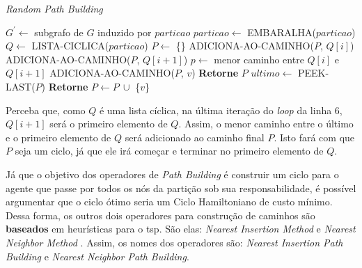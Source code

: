 \begin{algorithm}                   %
	\caption{\textit{Random Path Building}}          %
	\label{path_random}                           %
	\begin{algorithmic}[1]                   %
		\newline
		\State $G^{\prime} \gets $ subgrafo de $G$ induzido por $particao$
		\State $particao \gets $ EMBARALHA($particao$) 
		\State $Q \gets $ LISTA-CICLICA($particao$)
		\State $P \gets $ \{\} 
				\State ADICIONA-AO-CAMINHO($P$, $Q[i]$)
				\State ADICIONA-AO-CAMINHO($P$, $Q[i+1]$)
			\Else
				\State $p \gets $ menor caminho entre $Q[i]$ e $Q[i+1]$
					\State ADICIONA-AO-CAMINHO($P$, $v$)
				\EndFor
			\EndIf
		\EndFor
		\State \textbf{Retorne} $P$
		\EndProcedure
		\State $ultimo \gets $ PEEK-LAST($P$) 
			\State \textbf{Retorne}
		\Else
			\State $P \gets P\ \cup $ \{$v$\}
		\EndIf
		\EndProcedure
	\end{algorithmic}
\end{algorithm}

Perceba que, como $Q$ é uma lista cíclica, na última iteração do \textit{loop} 
da linha 6, $Q[i+1]$ será o primeiro elemento de $Q$. Assim, o menor caminho 
entre o último e o primeiro elemento de $Q$ será adicionado ao caminho final 
$P$. Isto fará com que $P$ seja um ciclo, já que ele irá começar e terminar no 
primeiro elemento de $Q$.

Já que o objetivo dos operadores de \textit{Path Building} é construir um ciclo 
para o agente que passe por todos os nós da partição sob sua responsabilidade, 
é possível argumentar que o ciclo ótimo seria um Ciclo Hamiltoniano de custo 
mínimo. Dessa forma, os outros dois operadores para construção de caminhos são 
\textbf{baseados} em heurísticas para o \ac{tsp}. São elas: 
\textit{Nearest Insertion Method} e \textit{Nearest Neighbor Method} 
\citep{nilsson2003heuristics}. Assim, os nomes dos operadores são: 
\textit{Nearest Insertion Path Building} e 
\textit{Nearest Neighbor Path Building}.

